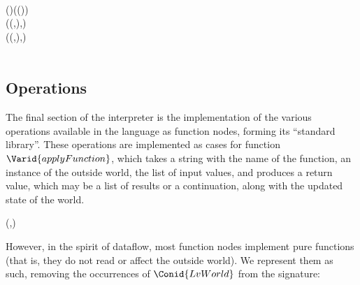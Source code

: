 \begin{hscode}
\\
\>[4]{}\<[7]%
\>[7]{}\<[14]%
\>[14]{}\mathrel{=}{}\<[17]%
\>[17]{}\;\;\mathbin{\$}\;(\;)\;(\;(\;)){}\<[E]%
\\[\blanklineskip]%
\>[4]{}\<[7]%
\>[7]{}\mathbin{::}{}\<[25]%
\>[25]{}\;\to ((,),)\to {}\;\<[E]%
\\
\>[4]{}\<[7]%
\>[7]{}\;\;((\anonymous ,\;),)\mathrel{=}{}\<[E]%
\\
\>[7]{}\<[10]%
\>[10]{}\;\;\;\<[E]%
\\
\>[4]{}\<[7]%
\>[7]{}\;\;\anonymous \mathrel{=}\<[E]%
\ColumnHook
\end{hscode}\resethooks

\subsection{Operations}

The final section of the interpreter is the implementation of the various
operations available in the language as function nodes, forming its
``standard library''. These operations
are implemented as cases for function \ensuremath{\Varid{applyFunction}}, which takes a
string with the name of the function, an instance of the outside world,
the list of input values, and produces a return value, which may be a list of
results or a continuation, along with the updated state of the world.

\begin{hscode}\SaveRestoreHook
{}%
%
\>[B]{}\mathbin{::}\to {}\to (,){}\<[E]%
\ColumnHook
\end{hscode}\resethooks

However, in the spirit of dataflow, most function nodes implement pure
functions (that is, they do not read or affect the outside world). We
represent them as such, removing the occurrences of \ensuremath{\Conid{LvWorld}} from the
signature:

